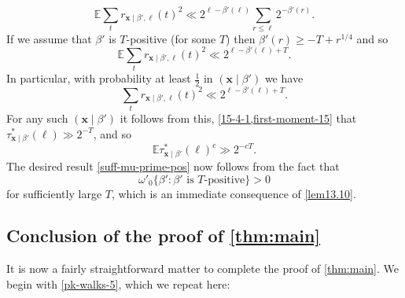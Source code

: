 \documentclass[11pt,reqno]{amsart}
\numberwithin{equation}{section}
\theoremstyle{definition}
\theoremstyle{remark}
\newcommand{\mb}{\mathbb}
\newcommand{\mbf}{\mathbf}
\renewcommand{\le}{\leqslant}
\renewcommand{\ge}{\geqslant}
\begin{document}
\[\mb{E} \sum_t r_{\mbf{x} \mid \beta',\ell}(t)^2 \ll 2^{\ell - \beta'(\ell)} \sum_{r \le \ell} 2^{-\beta'(r)}.\]
If we assume that $\beta'$ is $T$-positive (for some $T$) then $\beta'(r) \ge -T + r^{1/4}$ and so 
\[\mb{E} \sum_t r_{\mbf{x} \mid \beta',\ell}(t)^2 \ll 2^{\ell - \beta'(\ell) + T}.\] In particular, with probability at least $\frac{1}{2}$ in $(\mbf{x} \mid \beta')$ we have
\[ \sum_t r_{\mbf{x} \mid \beta',\ell}(t)^2 \ll 2^{\ell - \beta'(\ell) + T}.\]
For any such $(\mbf{x} \mid \beta')$ it follows from this, \cref{15-4-1,first-moment-15} that 
$\tau^*_{\mbf{x} \mid \beta'}(\ell) \gg 2^{-T}$, and so 
\[ \mb{E}\tau^*_{\mbf{x} \mid \beta'}(\ell)^c \gg 2^{-cT}. \]
The desired result \cref{suff-mu-prime-pos} now follows from the fact that 
\[ \omega'_0 \{ \beta' : \beta' \mbox{ is $T$-positive} \} > 0\] for sufficiently large $T$, which is an immediate consequence of \cref{lem13.10}.


\subsection{Conclusion of the proof of \cref{thm:main}}

It is now a fairly straightforward matter to complete the proof of \cref{thm:main}. We begin with \cref{pk-walks-5}, which we repeat here:
\end{document}
